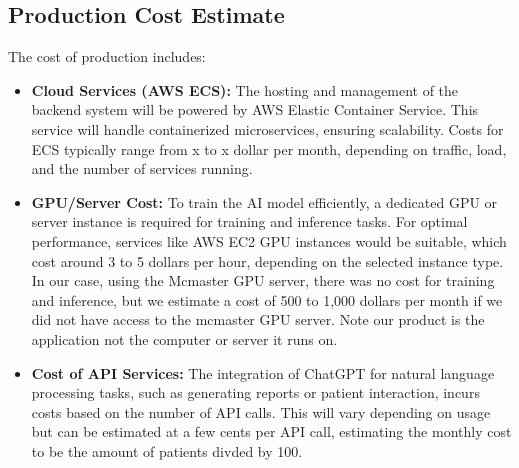 \documentclass{article}
\begin{document}
\subsection{Production Cost Estimate}
The cost of production includes:
\begin{itemize}
    \item \textbf{Cloud Services (AWS ECS):} The hosting and management of the backend system will be powered by AWS Elastic Container Service. This service will handle containerized microservices, ensuring scalability. Costs for ECS typically range from x to x dollar per month, depending on traffic, load, and the number of services running.
    \item \textbf{GPU/Server Cost:} To train the AI model efficiently, a dedicated GPU or server instance is required for training and inference tasks. For optimal performance, services like AWS EC2 GPU instances would be suitable, which cost around 3 to 5 dollars per hour, depending on the selected instance type. In our case, using the Mcmaster GPU server, there was no cost for training and inference, but we estimate a cost of 500 to 1,000 dollars per month if we did not have access to the mcmaster GPU server. Note our product is the application not the computer or server it runs on.
    \item \textbf{Cost of API Services:} The integration of ChatGPT for natural language processing tasks, such as generating reports or patient interaction, incurs costs based on the number of API calls. This will vary depending on usage but can be estimated at a few cents per API call, estimating the monthly cost to be the amount of patients divded by 100. 
\end{itemize}
\end{document}
